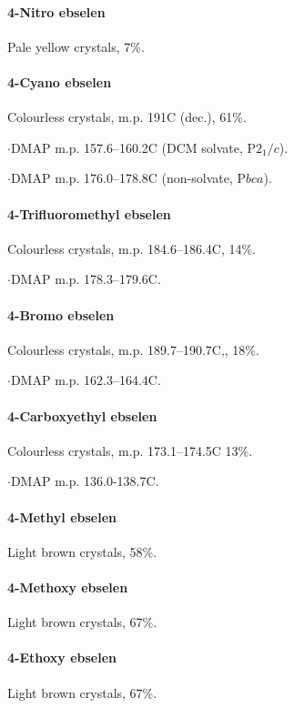 \paragraph{4-Nitro ebselen }
Pale yellow crystals, 7\%.

\paragraph{4-Cyano ebselen }
Colourless crystals, m.p. 191\degree C (dec.), 61\%.

$\cdot$DMAP m.p. 157.6--160.2\degree C (DCM solvate, P$2_1/c$).

$\cdot$DMAP m.p. 176.0--178.8\degree C (non-solvate, P$bca$).

\paragraph{4-Trifluoromethyl ebselen }
Colourless crystals, m.p. 184.6--186.4\degree C, 14\%.

$\cdot$DMAP m.p. 178.3--179.6\degree C.

\paragraph{4-Bromo ebselen }
Colourless crystals, m.p. 189.7--190.7\degree C,, 18\%.

$\cdot$DMAP m.p. 162.3--164.4\degree C.

\paragraph{4-Carboxyethyl ebselen }
Colourless crystals, m.p. 173.1--174.5\degree C 13\%.

$\cdot$DMAP m.p. 136.0-138.7\degree C.

\paragraph{4-Methyl ebselen }
Light brown crystals, 58\%.

\paragraph{4-Methoxy ebselen }
Light brown crystals, 67\%.

\paragraph{4-Ethoxy ebselen }
Light brown crystals, 67\%.

